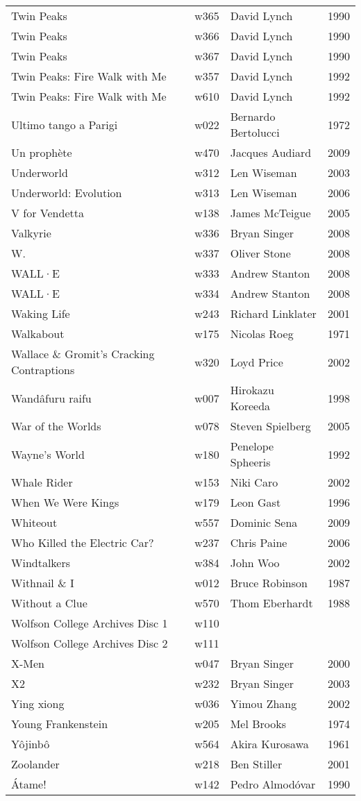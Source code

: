 \documentclass{article}
\begin{document}
\begin {center}
\begin{longtable}{p{10cm} l l l}
Twin Peaks & w365 & David Lynch & 1990 \\
Twin Peaks & w366 & David Lynch & 1990 \\
Twin Peaks & w367 & David Lynch & 1990 \\
Twin Peaks: Fire Walk with Me & w357 & David Lynch & 1992 \\
Twin Peaks: Fire Walk with Me & w610 & David Lynch & 1992 \\
Ultimo tango a Parigi & w022 & Bernardo Bertolucci & 1972 \\
Un prophète & w470 & Jacques Audiard & 2009 \\
Underworld & w312 & Len Wiseman & 2003 \\
Underworld: Evolution & w313 & Len Wiseman & 2006 \\
V for Vendetta & w138 & James McTeigue & 2005 \\
Valkyrie & w336 & Bryan Singer & 2008 \\
W. & w337 & Oliver Stone & 2008 \\
WALL·E & w333 & Andrew Stanton & 2008 \\
WALL·E & w334 & Andrew Stanton & 2008 \\
Waking Life & w243 & Richard Linklater & 2001 \\
Walkabout & w175 & Nicolas Roeg & 1971 \\
Wallace \& Gromit's Cracking Contraptions & w320 & Loyd Price & 2002 \\
Wandâfuru raifu & w007 & Hirokazu Koreeda & 1998 \\
War of the Worlds & w078 & Steven Spielberg & 2005 \\
Wayne's World & w180 & Penelope Spheeris & 1992 \\
Whale Rider & w153 & Niki Caro & 2002 \\
When We Were Kings & w179 & Leon Gast & 1996 \\
Whiteout & w557 & Dominic Sena & 2009 \\
Who Killed the Electric Car? & w237 & Chris Paine & 2006 \\
Windtalkers & w384 & John Woo & 2002 \\
Withnail \& I & w012 & Bruce Robinson & 1987 \\
Without a Clue & w570 & Thom Eberhardt & 1988 \\
Wolfson College Archives Disc 1 & w110 &  &  \\
Wolfson College Archives Disc 2 & w111 &  &  \\
X-Men & w047 & Bryan Singer & 2000 \\
X2 & w232 & Bryan Singer & 2003 \\
Ying xiong & w036 & Yimou Zhang & 2002 \\
Young Frankenstein & w205 & Mel Brooks & 1974 \\
Yôjinbô & w564 & Akira Kurosawa & 1961 \\
Zoolander & w218 & Ben Stiller & 2001 \\
Átame! & w142 & Pedro Almodóvar & 1990 \\
\hline
\end{longtable}
\end{center}
\end{document}
